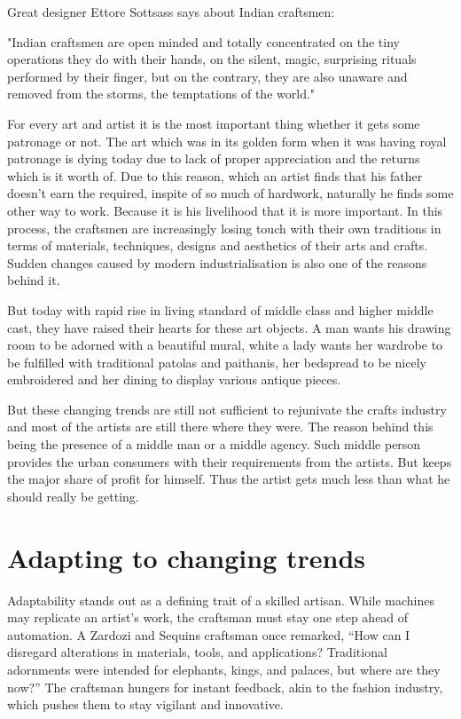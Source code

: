 Great designer Ettore Sottsass says about Indian craftsmen:

"Indian craftsmen are open minded and totally concentrated on the tiny operations they do with their hands, on the silent, magic, surprising rituals performed by their finger, but on the contrary, they are also unaware and removed from the storms, the temptations of the world."

For every art and artist it is the most important thing whether it gets some patronage or not. The art which was in its golden form when it was having royal patronage is dying today due to lack of proper appreciation and the returns which is it worth of. Due to this reason, which an artist finds that his father doesn't earn the required, inspite of so much of hardwork, naturally he finds some other way to work. Because it is his livelihood that it is more important. In this process, the craftsmen are increasingly losing touch with their own traditions in terms of materials, techniques, designs and aesthetics of their arts and crafts. Sudden changes caused by modern industrialisation is also one of the reasons behind it.

But today with rapid rise in living standard of middle class and higher middle cast, they have raised their hearts for these art objects. A man wants his drawing room to be adorned with a beautiful mural, white a lady wants her wardrobe to be fulfilled with traditional patolas and paithanis, her bedspread to be nicely embroidered and her dining to display various antique pieces.

But these changing trends are still not sufficient to rejunivate the crafts industry and most of the artists are still there where they were. The reason behind this being the presence of a middle man or a middle agency. Such middle person provides the urban consumers with their requirements from the artists. But keeps the major share of profit for himself. Thus the artist gets much less than what he should really be getting.


\section{Adapting to changing trends} %
\label{sec:act}

Adaptability stands out as a defining trait of a skilled artisan. While machines may replicate an artist's work, the craftsman must stay one step ahead of automation. A Zardozi and Sequins craftsman once remarked, ``How can I disregard alterations in materials, tools, and applications? Traditional adornments were intended for elephants, kings, and palaces, but where are they now?'' The craftsman hungers for instant feedback, akin to the fashion industry, which pushes them to stay vigilant and innovative.

